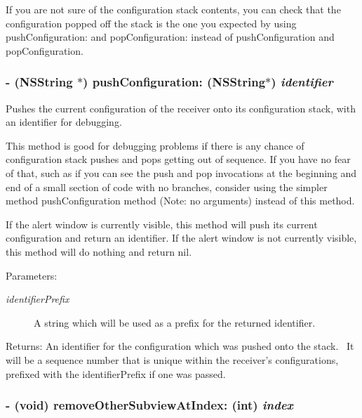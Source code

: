 If you are not sure of the configuration stack contents, you can check that the configuration popped off the stack is the one you expected by using pushConfiguration: and popConfiguration: instead of pushConfiguration and popConfiguration. \hypertarget{interface_s_s_y_alert_f251640252cc9f568b5622c1a74e62ed}{
\subsubsection[{pushConfiguration:}]{\setlength{\rightskip}{0pt plus 5cm}- (NSString $\ast$) pushConfiguration: (NSString$\ast$) {\em identifier}}}
\label{interface_s_s_y_alert_f251640252cc9f568b5622c1a74e62ed}


Pushes the current configuration of the receiver onto its configuration stack, with an identifier for debugging. 

This method is good for debugging problems if there is any chance of configuration stack pushes and pops getting out of sequence. If you have no fear of that, such as if you can see the push and pop invocations at the beginning and end of a small section of code with no branches, consider using the simpler method pushConfiguration method (Note: no arguments) instead of this method. 

If the alert window is currently visible, this method will push its current configuration and return an identifier. If the alert window is not currently visible, this method will do nothing and return nil. \begin{Desc}
\item[Parameters:]
\begin{description}
\item[{\em identifierPrefix}]A string which will be used as a prefix for the returned identifier. \end{description}
\end{Desc}
\begin{Desc}
\item[Returns:]An identifier for the configuration which was pushed onto the stack.~ It will be a sequence number that is unique within the receiver's configurations, prefixed with the identifierPrefix if one was passed. \end{Desc}
\hypertarget{interface_s_s_y_alert_42a3e095cf9380845f1425ddab0ca00d}{
\subsubsection[{removeOtherSubviewAtIndex:}]{\setlength{\rightskip}{0pt plus 5cm}- (void) removeOtherSubviewAtIndex: (int) {\em index}}}
\label{interface_s_s_y_alert_42a3e095cf9380845f1425ddab0ca00d}


